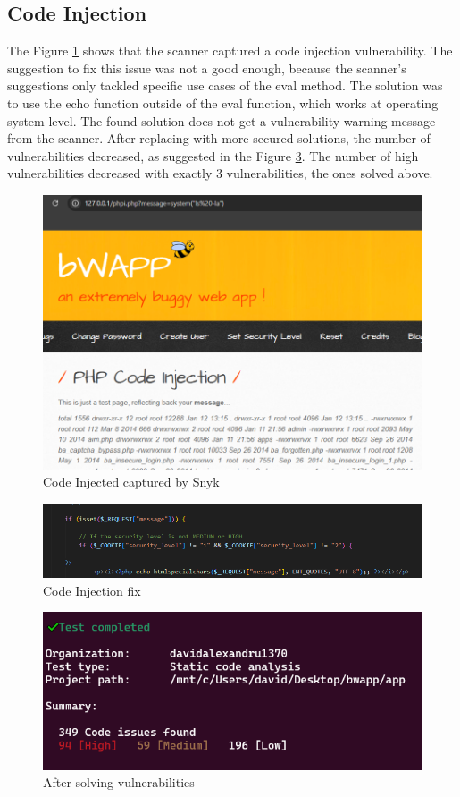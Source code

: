 \documentclass{article}
\begin{document}
\subsection{Code Injection}
\par The Figure \ref{fig:snyk-code-injection-issue} shows that the scanner captured a code injection vulnerability. The suggestion to fix this issue was not a good enough, because the scanner's suggestions only tackled specific use cases of the eval method. The solution was to use the echo function outside of the eval function, which works at operating system level. The found solution does not get a vulnerability warning message from the scanner. After replacing with more secured solutions, the number of vulnerabilities decreased, as suggested in the Figure \ref{fig:final-vulnerabilities-count}. The number of high vulnerabilities decreased with exactly 3 vulnerabilities, the ones solved above.
\begin{figure}[H]
    \centering
    \includegraphics[width=0.5\linewidth]{Figures/defensive/code-injection.PNG}
    \caption{Code Injected captured by Snyk}
    \label{fig:snyk-code-injection-issue}
\end{figure}
\begin{figure}[H]
    \centering
    \includegraphics[width=0.5\linewidth]{Figures/defensive/code-injection-snyk-fix.PNG}
    \caption{Code Injection fix}
    \label{fig:snyk-code-injection-fix}
\end{figure}
\begin{figure}[H]
    \centering
    \includegraphics[width=0.5\linewidth]{Figures/defensive/issues2.PNG}
    \caption{After solving vulnerabilities}
    \label{fig:final-vulnerabilities-count}
\end{figure}
\end{document}
